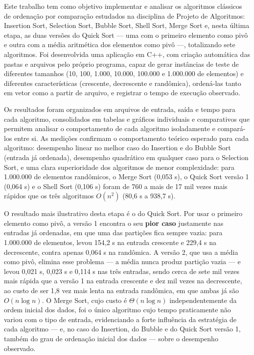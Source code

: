 \qquad Este trabalho tem como objetivo implementar e analisar os
algoritmos clássicos de ordenação por comparação estudados na
disciplina de Projeto de Algoritmos: Insertion Sort, Selection Sort,
Bubble Sort, Shell Sort, Merge Sort e, nesta última etapa, as duas
versões do Quick Sort --- uma com o primeiro elemento como pivô e
outra com a média aritmética dos elementos como pivô ---, totalizando
sete algoritmos. Foi desenvolvida uma aplicação em C++, com criação
automática das pastas e arquivos pelo próprio programa, capaz de gerar
instâncias de teste de diferentes tamanhos (10, 100, 1.000, 10.000,
100.000 e 1.000.000 de elementos) e diferentes características
(crescente, decrescente e randômica), ordená-las tanto em vetor como a
partir de arquivo, e registrar o tempo de execução observado.

\qquad Os resultados foram organizados em arquivos de entrada, saída e
tempo para cada algoritmo, consolidados em tabelas e gráficos
individuais e comparativos que permitem analisar o comportamento de
cada algoritmo isoladamente e compará-los entre si. As medições
confirmam o comportamento teórico esperado para cada algoritmo:
desempenho linear no melhor caso do Insertion e do Bubble Sort
(entrada já ordenada), desempenho quadrático em qualquer caso para o
Selection Sort, e uma clara superioridade dos algoritmos de menor
complexidade: para 1.000.000 de elementos randômicos, o Merge Sort
(0,053 s), o Quick Sort versão 1 (0,064 s) e o Shell Sort (0,106 s)
foram de 760 a mais de 17 mil vezes mais rápidos que os três
algoritmos $O(n^2)$ (80,6 s a 938,7 s).

\qquad O resultado mais ilustrativo desta etapa é o do Quick Sort. Por
usar o primeiro elemento como pivô, a versão 1 encontra o seu
\textbf{pior caso} justamente nas entradas já ordenadas, em que uma das
partições fica sempre vazia: para 1.000.000 de elementos, levou
154,2 s na entrada crescente e 229,4 s na decrescente, contra apenas
0,064 s na randômica. A versão 2, que usa a média como pivô, elimina
esse problema --- a média nunca produz partição vazia --- e levou
0,021 s, 0,023 s e 0,114 s nas três entradas, sendo cerca de sete mil
vezes mais rápida que a versão 1 na entrada crescente e dez mil vezes
na decrescente, ao custo de ser 1,8 vez mais lenta na entrada
randômica, em que ambas já são $O(n \log n)$. O Merge Sort, cujo custo
é $\Theta(n \log n)$ independentemente da ordem inicial dos dados, foi
o único algoritmo cujo tempo praticamente não variou com o tipo de
entrada, evidenciando a forte influência da estratégia de cada
algoritmo --- e, no caso do Insertion, do Bubble e do Quick Sort
versão 1, também do grau de ordenação inicial dos dados --- sobre o
desempenho observado.
